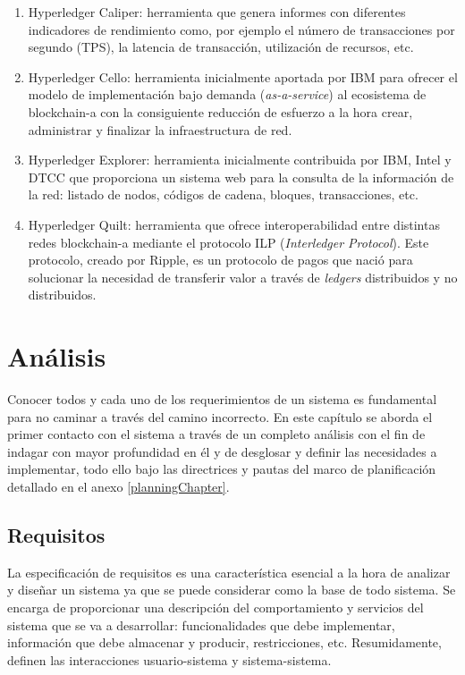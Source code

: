 \documentclass[12pt,a4paper, twoside]{report}
\begin{document}
\begin{enumerate}
		\item Hyperledger Caliper: herramienta que genera informes con diferentes indicadores de rendimiento como, por ejemplo el número de transacciones por segundo (TPS), la latencia de transacción, utilización de recursos, etc.
		
		\item Hyperledger Cello: herramienta inicialmente aportada por IBM para ofrecer el modelo de implementación bajo demanda (\textit{as-a-service}) al ecosistema de \gls{blockchain-a} con la consiguiente reducción de esfuerzo a la hora crear, administrar y finalizar la infraestructura de red.
				
		\item Hyperledger Explorer: herramienta inicialmente contribuida por IBM, Intel y DTCC que proporciona un sistema web para la consulta de la información de la red: listado de nodos, códigos de cadena, bloques, transacciones, etc.
		
		\item Hyperledger Quilt: herramienta que ofrece interoperabilidad entre distintas redes \gls{blockchain-a} mediante el protocolo ILP (\textit{Interledger Protocol}). Este protocolo, creado por Ripple, es un protocolo de pagos que nació para solucionar la necesidad de transferir valor a través de \textit{ledgers} distribuidos y no distribuidos.
	\end{enumerate}

	\chapter{Análisis} \label{analysisChapter}
		
	Conocer todos y cada uno de los requerimientos de un sistema es fundamental para no caminar a través del camino incorrecto. En este capítulo se aborda el primer contacto con el sistema a través de un completo análisis con el fin de indagar con mayor profundidad en él y de desglosar y definir las necesidades a implementar, todo ello bajo las directrices y pautas del marco de planificación detallado en el anexo \ref{planningChapter}.

	\section{Requisitos}

	La especificación de requisitos es una característica esencial a la hora de analizar y diseñar un sistema ya que se puede considerar como la base de todo sistema. Se encarga de proporcionar una descripción del comportamiento y servicios del sistema que se va a desarrollar: funcionalidades que debe implementar, información que debe almacenar y producir, restricciones, etc. Resumidamente, definen las interacciones usuario-sistema y sistema-sistema.\\
	
\end{document}
